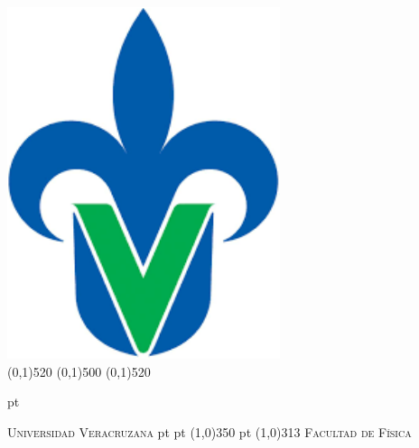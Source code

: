 \newdimen\MSup
\newdimen\MIzq

\MSup=48pt   
\MIzq=65pt  


\newenvironment{changemargin}[1]{%
\begin{list}{}{%
\setlength{\leftmargin}{#1}%
\setlength{\topmargin}{-100pt}
\setlength{\parsep}{\parskip}%
}\item[]
}{\end{list}}

\addtolength{\topmargin}{-\MSup}

\begin{changemargin}{-\MIzq}
\thispagestyle{empty}
\begin{minipage}[c][1pt][t]{0.2\paperwidth}
\begin{center}

\includegraphics [scale=.75 ]{UV.pdf}\\
\vskip 527.5pt
\hskip -4pt
\linethickness{1.8pt} 
\line(0,1){520}
\linethickness{0.9pt} 
\line(0,1){500}
\linethickness{1.8pt} 
\line(0,1){520}
\end{center}
\end{minipage}
 pt     %
\begin{minipage}[c][1pt][t]{0.6\paperwidth}
\begin{center}
\vskip 30pt
{\huge \scshape Universidad Veracruzana} 
{ pt
 pt 
\linethickness{1.6pt} 
\line(1,0){350}}
{\vskip 0pt
 pt
\linethickness{.9pt}
\centering
\line(1,0){313}}
\vskip 11pt
{\LARGE \scshape Facultad de F\'isica}
\end{center}
\end{minipage} 


\end{changemargin}
